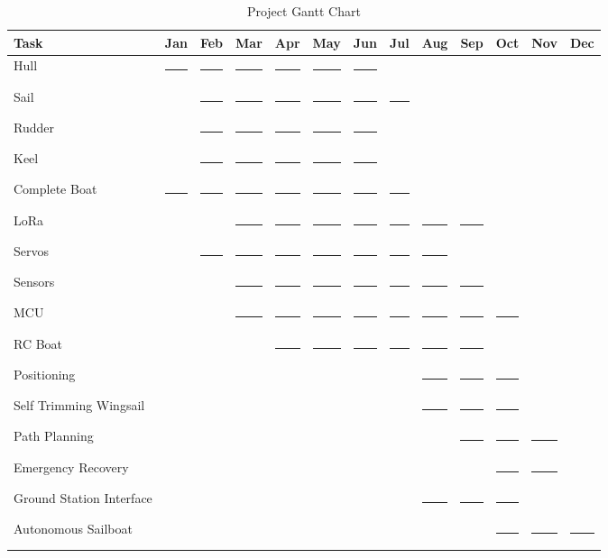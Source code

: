 
\begin{table}[htbp]
\centering
\caption{Project Gantt Chart}
\label{tab:gantt}
\footnotesize
\setlength{\tabcolsep}{2pt}
\newcommand{\gb}{\rule{0.85cm}{5pt}}
\begin{tabular}{|p{3.5cm}|c|c|c|c|c|c|c|c|c|c|c|c|}
\hline
\textbf{Task} & \textbf{Jan} & \textbf{Feb} & \textbf{Mar} & \textbf{Apr} & \textbf{May} & \textbf{Jun} & \textbf{Jul} & \textbf{Aug} & \textbf{Sep} & \textbf{Oct} & \textbf{Nov} & \textbf{Dec} \\
\hline
Hull & \gb & \gb & \gb & \gb & \gb & \gb & & & & & & \\
\hline
Sail & & \gb & \gb & \gb & \gb & \gb & \gb & & & & & \\
\hline
Rudder & & \gb & \gb & \gb & \gb & \gb & & & & & & \\
\hline
Keel & & \gb & \gb & \gb & \gb & \gb & & & & & & \\
\hline
Complete Boat & \gb & \gb & \gb & \gb & \gb & \gb & \gb & & & & & \\
\hline
LoRa & & & \gb & \gb & \gb & \gb & \gb & \gb & \gb & & & \\
\hline
Servos & & \gb & \gb & \gb & \gb & \gb & \gb & \gb & & & & \\
\hline
Sensors & & & \gb & \gb & \gb & \gb & \gb & \gb & \gb & & & \\
\hline
MCU & & & \gb & \gb & \gb & \gb & \gb & \gb & \gb & \gb & & \\
\hline
RC Boat & & & & \gb & \gb & \gb & \gb & \gb & \gb & & & \\
\hline
Positioning & & & & & & & & \gb & \gb & \gb & & \\
\hline
Self Trimming Wingsail & & & & & & & & \gb & \gb & \gb & & \\
\hline
Path Planning & & & & & & & & & \gb & \gb & \gb & \\
\hline
Emergency Recovery & & & & & & & & & & \gb & \gb & \\
\hline
Ground Station Interface & & & & & & & & \gb & \gb & \gb & & \\
\hline
Autonomous Sailboat & & & & & & & & & & \gb & \gb & \gb \\
\hline
\end{tabular}
\end{table}

